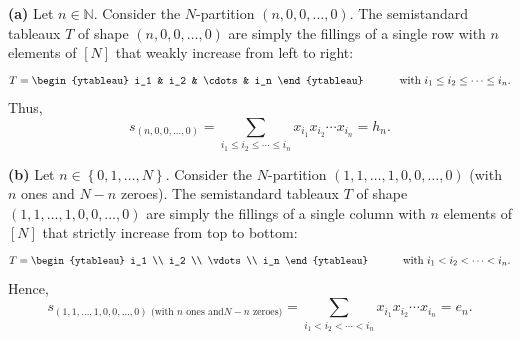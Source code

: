 \begin{example}
\label{exa.sf.schur-h-e}\textbf{(a)} Let $n\in\mathbb{N}$. Consider the
$N$-partition $\left(  n,0,0,\ldots,0\right)  $. The semistandard tableaux $T$
of shape $\left(  n,0,0,\ldots,0\right)  $ are simply the fillings of a single
row with $n$ elements of $\left[  N\right]  $ that weakly increase from left
to right:%
\[
T=\begin{ytableau}
i_1 & i_2 & \cdots & i_n
\end{ytableau}\ \ \ \ \ \ \ \ \ \ \text{with }i_{1}\leq i_{2}\leq\cdots\leq
i_{n}.
\]
Thus,
\[
s_{\left(  n,0,0,\ldots,0\right)  }=\sum_{i_{1}\leq i_{2}\leq\cdots\leq i_{n}%
}x_{i_{1}}x_{i_{2}}\cdots x_{i_{n}}=h_{n}.
\]


\textbf{(b)} Let $n\in\left\{  0,1,\ldots,N\right\}  $. Consider the
$N$-partition $\left(  1,1,\ldots,1,0,0,\ldots,0\right)  $ (with $n$ ones and
$N-n$ zeroes). The semistandard tableaux $T$ of shape $\left(  1,1,\ldots
,1,0,0,\ldots,0\right)  $ are simply the fillings of a single column with $n$
elements of $\left[  N\right]  $ that strictly increase from top to bottom:%
\[
T=\begin{ytableau}
i_1 \\ i_2 \\ \vdots \\ i_n
\end{ytableau}\ \ \ \ \ \ \ \ \ \ \text{with }i_{1}<i_{2}<\cdots<i_{n}.
\]
Hence,%
\[
s_{\left(  1,1,\ldots,1,0,0,\ldots,0\right)  \text{ (with }n\text{ ones and
}N-n\text{ zeroes)}}=\sum_{i_{1}<i_{2}<\cdots<i_{n}}x_{i_{1}}x_{i_{2}}\cdots
x_{i_{n}}=e_{n}.
\]



\end{example}
